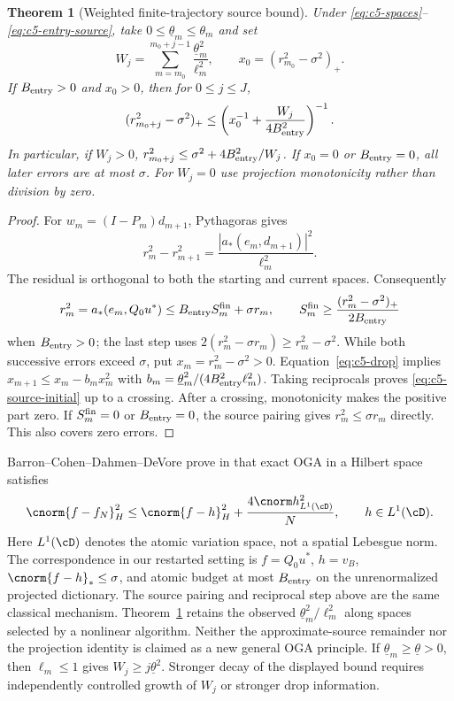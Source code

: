 \documentclass[11pt]{article}
\newtheorem{theorem}{Theorem}[section]
\theoremstyle{remark}
\begin{document}
\begin{theorem}[Weighted finite-trajectory source bound]
\label{thm:c5-source}
Under \eqref{eq:c5-spaces}--\eqref{eq:c5-entry-source}, take
$0\leq\underline\theta_m\leq\theta_m$ and set
\[
 W_j=\sum_{m=m_0}^{m_0+j-1}\frac{\underline\theta_m^2}{\ell_m^2},
 \qquad x_0=(r_{m_0}^2-\sigma^2)_+ .
\]
If $B_{\rm entry}>0$ and $x_0>0$, then for $0\leq j\leq J$,
\begin{equation}
 (r_{m_0+j}^2-\sigma^2)_+
 \leq\left(x_0^{-1}+\frac{W_j}{4B_{\rm entry}^2}\right)^{-1}.
 \label{eq:c5-source-initial}
\end{equation}
In particular, if $W_j>0$,
$r_{m_0+j}^2\leq\sigma^2+4B_{\rm entry}^2/W_j$.
If $x_0=0$ or $B_{\rm entry}=0$, all later errors are at most $\sigma$.
For $W_j=0$ use projection monotonicity rather than division by zero.
\end{theorem}
\begin{proof}
For $w_m=(I-P_m)d_{m+1}$, Pythagoras gives
\begin{equation}
 r_m^2-r_{m+1}^2
 =\frac{|a_*(e_m,d_{m+1})|^2}{\ell_m^2}.
 \label{eq:c5-drop}
\end{equation}
The residual is orthogonal to both the starting and current spaces.
Consequently
\[
 r_m^2=a_*(e_m,Q_0u^*)\leq B_{\rm entry}S_m^{\rm fin}+\sigma r_m,
 \qquad
 S_m^{\rm fin}\geq\frac{(r_m^2-\sigma^2)_+}{2B_{\rm entry}}
\]
when $B_{\rm entry}>0$; the last step uses
$2(r_m^2-\sigma r_m)\geq r_m^2-\sigma^2$.
While both successive errors exceed $\sigma$, put
$x_m=r_m^2-\sigma^2>0$. Equation~\eqref{eq:c5-drop} implies
$x_{m+1}\leq x_m-b_mx_m^2$ with
$b_m=\underline\theta_m^2/(4B_{\rm entry}^2\ell_m^2)$.
Taking reciprocals proves \eqref{eq:c5-source-initial} up to a crossing.
After a crossing, monotonicity makes the positive part zero.
If $S_m^{\rm fin}=0$ or $B_{\rm entry}=0$, the source pairing gives
$r_m^2\leq\sigma r_m$ directly. This also covers zero errors.
\end{proof}

Barron--Cohen--Dahmen--DeVore prove in
\cite[Theorem~2.3, equation~(2.31)]{BarronCohenDahmenDeVore2008}
that exact OGA in a Hilbert space satisfies
\begin{equation}
 \cnorm{f-f_N}_H^2\leq\cnorm{f-h}_H^2+
            \frac{4\cnorm h_{L^1(\cD)}^2}{N},\qquad h\in L^1(\cD).
 \label{eq:c5-barron}
\end{equation}
Here $L^1(\cD)$ denotes the atomic variation space, not a spatial
Lebesgue norm. The correspondence in our restarted setting is
$f=Q_0u^*$, $h=v_B$, $\cnorm{f-h}_*\leq\sigma$, and atomic budget
at most $B_{\rm entry}$ on the unrenormalized projected dictionary.
The source pairing and reciprocal step above are the same classical
mechanism. Theorem~\ref{thm:c5-source} retains the observed
$\underline\theta_m^2/\ell_m^2$ along spaces selected by a nonlinear
algorithm. Neither the approximate-source remainder nor the projection
identity is claimed as a new general OGA principle.
If $\underline\theta_m\geq\underline\theta>0$, then $\ell_m\leq1$
gives $W_j\geq j\underline\theta^2$.
Stronger decay of the displayed bound requires independently controlled
growth of $W_j$ or stronger drop information.
\end{document}

